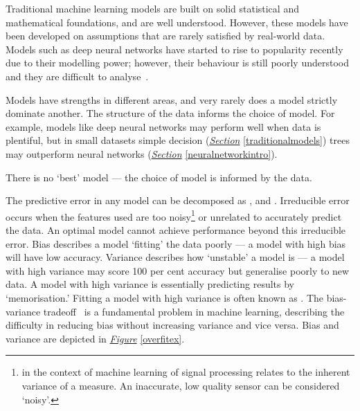 \documentclass[12pt, twoside]{book}
\renewcommand\emph[1]{\textit{\color{USred}{#1}}}
\begin{document}
Traditional machine learning models are built on solid statistical and mathematical foundations, and are well understood. However, these models have been developed on assumptions that are rarely satisfied by real-world data. Models such as deep neural networks have started to rise to popularity recently due to their modelling power; however, their behaviour is still poorly understood and they are difficult to analyse~\cite{visualisernn}.    

Models have strengths in different areas, and very rarely does a model strictly dominate another. The structure of the data informs the choice of model. For example, models like deep neural networks may perform well when data is plentiful, but in small datasets simple decision (\textit{\hyperref[traditionalmodels]{Section}} \ref{traditionalmodels}) trees may outperform neural networks (\textit{\hyperref[neuralnetworkintro]{Section}} \ref{neuralnetworkintro}).





\begin{highlight}
There is no `best' model --- the choice of model is informed by the data. 
\end{highlight}

The predictive error in any model can be decomposed as \emph{irreducible error}, \emph{bias} and \emph{variance}. Irreducible error occurs when the features used are too noisy\footnote{\emph{Noisy} in the context of machine learning of signal processing relates to the inherent variance of a measure. An inaccurate, low quality sensor can be considered `noisy'.} or unrelated to accurately predict the data. An optimal model cannot achieve performance beyond this irreducible error. Bias describes a model `fitting' the data poorly --- a model with high bias will have low accuracy. Variance describes how `unstable' a model is --- a model with high variance may score 100 per cent accuracy but generalise poorly to new data. A model with high variance is essentially predicting results by `memorisation.' Fitting a model with high variance is often known as \emph{overfitting}. The bias-variance tradeoff~\cite{biasvarnn} is a fundamental problem in machine learning, describing the difficulty in reducing bias without increasing variance and vice versa. Bias and variance are depicted in \textit{\hyperref[overfitex]{Figure}} \ref{overfitex}.

\end{document}

